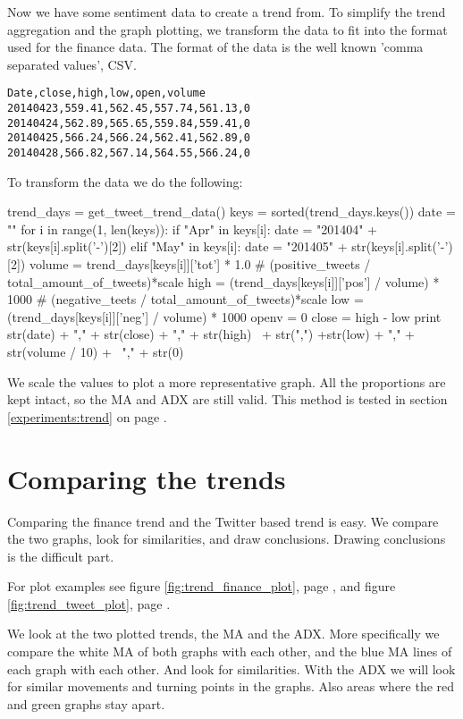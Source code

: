 Now we have some sentiment data to create a trend from. To simplify the trend
aggregation and the graph plotting, we transform the data to fit into the
format used for the finance data. The format of the data is the well known
'comma separated values', CSV.  

\begin{verbatim}
Date,close,high,low,open,volume
20140423,559.41,562.45,557.74,561.13,0
20140424,562.89,565.65,559.84,559.41,0
20140425,566.24,566.24,562.41,562.89,0
20140428,566.82,567.14,564.55,566.24,0
\end{verbatim}

To transform the data we do the following: 
\begin{python}
trend_days = get_tweet_trend_data()
keys = sorted(trend_days.keys())
date = ""
for i in range(1, len(keys)):
    if "Apr" in keys[i]:
        date = "201404" + str(keys[i].split('-')[2])
    elif "May" in keys[i]:
        date = "201405" + str(keys[i].split('-')[2])
    volume = trend_days[keys[i]]['tot'] * 1.0
    # (positive_tweets / total_amount_of_tweets)*scale
    high = (trend_days[keys[i]]['pos'] / volume) * 1000
    # (negative_teets / total_amount_of_tweets)*scale
    low = (trend_days[keys[i]]['neg'] / volume) * 1000
    openv = 0
    close = high - low
    print str(date) + "," + str(close) + "," + str(high) \
          + str(",") +str(low) + "," + str(volume / 10) + \
          "," + str(0)
\end{python}

We scale the values to plot a more representative graph. All the
proportions are kept intact, so the MA and ADX are still valid.
This method is tested in section \ref{experiments:trend} on page
\pageref{experiments:trend}.
% 

\section{Comparing the trends}\label{trend:compared}
Comparing the finance trend and the Twitter based trend is easy. We compare the
two graphs, look for similarities, and draw conclusions. Drawing conclusions is
the difficult part.

For plot examples see figure \ref{fig:trend_finance_plot}, page
\pageref{fig:trend_finance_plot}, and figure \ref{fig:trend_tweet_plot}, page
\pageref{fig:trend_tweet_plot}.

We look at the two plotted trends, the MA and the ADX. More specifically we
compare the white MA of both graphs with each other, and the blue MA lines of
each graph with each other. And look for similarities. With the ADX we will look
for similar movements and turning points in the graphs. Also areas where the
red and green graphs stay apart.  


